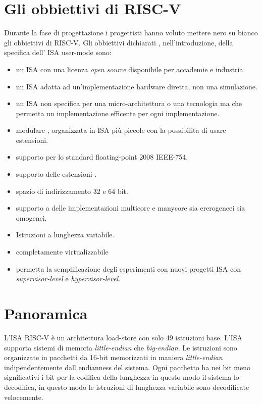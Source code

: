 \documentclass[12pt,a4paper]{report}
\begin{document}
\section{Gli obbiettivi di RISC-V}
Durante la fase di progettazione i progettisti hanno voluto mettere nero su bianco gli obbiettivi di RISC-V. Gli obbiettivi dichiarati , nell'introduzione, della specifica dell' ISA user-mode sono:
\begin{itemize}
	\item un ISA con una licenza \textit{open source} disponibile per accademie e industria.
	\item un ISA adatta ad un’implementazione hardware diretta, non una simulazione.
	\item un ISA non specifica per una micro-architettura o una tecnologia ma che permetta un implementazione efficente per ogni implementazione.
	\item modulare , organizzata in ISA più piccole con la possibilita di usare estensioni.
	\item supporto per lo standard floating-point 2008 IEEE-754.
	\item supporto delle estensioni .
	\item spazio di indirizzamento 32 e 64 bit.
	\item supporto a delle implementazioni multicore e manycore sia ererogeneei sia omogenei.
	\item Istruzioni a lunghezza variabile.
	\item completamente virtualizzabile 
	\item permetta la semplificazione degli esperimenti con nuovi progetti ISA con \textit{supervisor-level} e \textit{hypervisor-level}. 
	
\end{itemize}

\section{Panoramica}
L'ISA RISC-V è un architettura load-store con solo 49 istruzioni base. L'ISA supporta sistemi di memoria \textit{little-endian} che \textit{big-endian}. Le istruzioni sono organizzate in pacchetti da 16-bit memorizzati in maniera \textit{little-endian} indipendentemente dall endianness del sistema.  Ogni pacchetto ha nei bit meno significativi i bit per la codifica della lunghezza in questo modo il sistema lo decodifica, in questo modo le istruzioni di lunghezza variabile sono decodificate velocemente.
\end{document}

